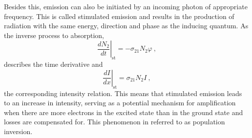 Besides this, emission can also be initiated by an incoming photon of appropriate frequency. This is called stimulated emission and results
in the production of radiation with the same energy, direction and phase as the inducing quantum. As the inverse process to absorption,
\begin{equation*}
	\left. \frac{dN_2}{dt} \right|_\text{st} = -\sigma_{21} N_2 \varphi \: ,
\end{equation*}
describes the time derivative and
\begin{equation*}
	\left. \frac{dI}{dx} \right|_\text{st} = \sigma_{21} N_2 I \: ,
\end{equation*}
the corresponding intensity relation. This means that stimulated emission leads to an increase in intensity, serving as a potential
mechanism for amplification when there are more electrons in the excited state than in the ground state and losses are compensated for.
This phenomenon in referred to as population inversion.

